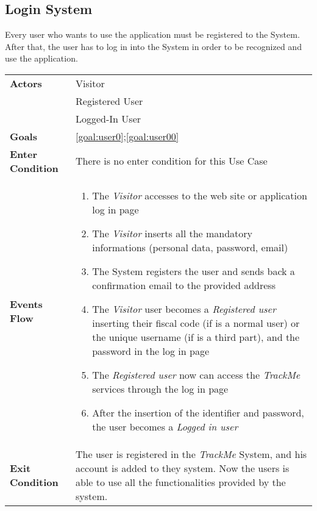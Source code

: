   \subsection{Login System}
Every user who wants to use the application must be registered to the System.
After that, the user has to log in into the System in order to be recognized and use the application.

\begin{table}[H]
	\centering
    
    \begin{tabular}{|p{3.5cm}|p{10.3cm}|}
    
    \hline
    \textbf{\large{Actors}}  			& \tabitem Visitor 									\\
    				 					& \tabitem Registered User							\\
                     					& \tabitem Logged-In User 							\\
    \hline
    \textbf{\large{Goals}} 				& \ref{goal:user0};\ref{goal:user00}\\
    
    \hline
    \textbf{\large{Enter Condition}}	& There is no enter condition for this Use Case		\\
    
    \hline
    \textbf{\large{Events Flow}}		& \begin{enumerate}[leftmargin=0.5cm]
                                          	\item The \emph{Visitor}  accesses to the web site or application log in page
                                            \item The \emph{Visitor} inserts all the mandatory informations (personal data, password, email)
                                            \item The System registers the user and sends back a confirmation email to the provided address
                                            \item The \emph{Visitor} user becomes a \emph{Registered user} inserting their fiscal code (if is a normal user) or the unique username (if is a third part), and the password in the log in page   
                                            \item The \emph{Registered user} now can access the \emph{TrackMe} services through the log in page
                                            
                                            \item After the insertion of the identifier and password, the user becomes a \emph{Logged in user}
                                          \end{enumerate}
    										\\
    \hline
    \textbf{\large{Exit Condition}} 	& The user is registered in the \emph{TrackMe} System, and his account is added to they system. Now the users is able to use all the functionalities provided by the system. \\
    

\end{tabular}
\end{table}
